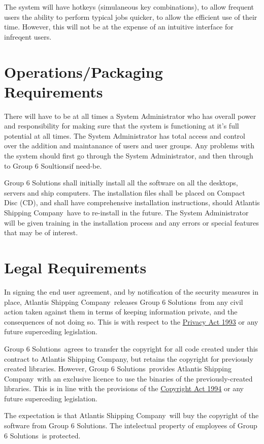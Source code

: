 \documentclass[a4paper,10pt]{report}
\begin{document}
The system will have hotkeys (simulaneous key combinations), to allow frequent users the ability to perform typical jobs quicker, to allow the efficient use of their time. However, this will not be at the expense of an intuitive interface for infreqent users.



\section{Operations/Packaging Requirements}
There will have to be at all times a System Administrator who has overall power and responsibility for making sure that the system is functioning at it's full potential at all times.  The System Administrator has total access and control over the addition and maintanance of users and user groups.  Any problems with the system should first go through the System Administrator, and then through to Group 6 Soultions\textregistered if need-be.

Group 6 Solutions shall initially install all the software on all the desktops, servers and ship computers.  The installation files shall be placed on Compact Disc (CD), and shall have comprehensive installation instructions, should Atlantis Shipping Company\textregistered\ have to re-install in the future.  The System Administrator will be given training in the installation process and any errors or special features that may be of interest.



\section{Legal Requirements}
In signing the end user agreement, and by notification of the security measures in place, Atlantis Shipping Company\textregistered\ releases Group 6 Solutions\textregistered\ from any civil action taken against them in terms of keeping information private, and the consequences of not doing so.  This is with respect to the \underline{Privacy Act 1993} or any future superceding legislation.

Group 6 Solutions\textregistered\ agrees to transfer the copyright for all code created under this contract to Atlantis Shipping Company\textregistered, but retains the copyright for previously created libraries. However, Group 6 Solutions\textregistered\ provides Atlantis Shipping Company\textregistered\ with an exclusive licence to use the binaries of the previously-created libraries. This is in line with the provisions of the \underline{Copyright Act 1994} or any future superceding legislation.

The expectation is that Atlantis Shipping Company\textregistered\ will buy the copyright of the software from Group 6 Solutions\textregistered .  The intelectual property of employees of Group 6 Solutions\textregistered\ is protected.
\end{document}
